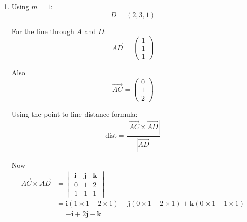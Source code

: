 \documentclass[leqno]{article}
\begin{document}
\begin{enumerate}[
  label=\textbf{\arabic*.},
  leftmargin=*,
  topsep=0pt,
  partopsep=0pt,
  parsep=0pt
]
\begin{djsSolution}
\begin{enumerate}[label=\textbf{(\alph*)}]
Next
\begin{align*}
\left\lvert \overrightarrow{AD}\times\overrightarrow{BC}\right\rvert^2
&=(2-m)^2+(-2-m)^2+2^2 \\
&=(m^2-4m+4)+(m^2+4m+4)+4 \\
&=2m^2+12
\end{align*}

So
\[
\left\lvert \overrightarrow{AD}\times\overrightarrow{BC}\right\rvert=\sqrt{2m^2+12}
\]

Therefore the shortest distance is
\[
\frac{|2-m|}{\sqrt{2m^2+12}}
\]

This is given to be \(\frac{1}{\sqrt{14}}\), so
\[
\frac{|2-m|}{\sqrt{2m^2+12}}=\frac{1}{\sqrt{14}}
\]

Squaring both sides:
\begin{align*}
14(2-m)^2&=2m^2+12 \\
14(m^2-4m+4)&=2m^2+12 \\
14m^2-56m+56&=2m^2+12 \\
12m^2-56m+44&=0 \\
3m^2-14m+11&=0
\end{align*}

Factorising:
\[
3m^2-14m+11=(3m-11)(m-1)
\]

So
\[
(3m-11)(m-1)=0
\]

Hence
\[
m=\frac{11}{3}\quad \text{or}\quad m=1
\]

Since \(m\) is an integer, the only possible value is
\[
m=1
\]

\item Using \(m=1\):
\[
D=(2,3,1)
\]

For the line through \(A\) and \(D\):
\[
\overrightarrow{AD}=\begin{pmatrix}1\\1\\1\end{pmatrix}
\]

Also
\[
\overrightarrow{AC}=\begin{pmatrix}0\\1\\2\end{pmatrix}
\]

Using the point-to-line distance formula:
\[
\mathrm{dist}=\frac{\left\lvert \overrightarrow{AC}\times\overrightarrow{AD}\right\rvert}{\left\lvert \overrightarrow{AD}\right\rvert}
\]

Now
\begin{align*}
\overrightarrow{AC}\times\overrightarrow{AD}
&=
\begin{vmatrix}
\mathbf i & \mathbf j & \mathbf k\\
0 & 1 & 2\\
1 & 1 & 1
\end{vmatrix} \\
&=\mathbf i(1\times 1-2\times 1)-\mathbf j(0\times 1-2\times 1)+\mathbf k(0\times 1-1\times 1) \\
&=-\mathbf i+2\mathbf j-\mathbf k
\end{align*}


\end{enumerate}
\end{djsSolution}
\end{enumerate}
\end{document}
